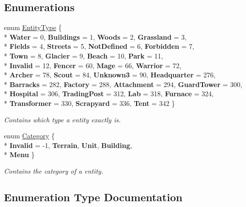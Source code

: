 \subsection*{Enumerations}
\begin{DoxyCompactItemize}
\item 
enum \hyperlink{namespaceCore_1_1Models_1_1Definitions_a609ed13db028308ebc6c5fbd98615fdc}{Entity\+Type} \{ \\*
{\bfseries Water} = 0, 
{\bfseries Buildings} = 1, 
{\bfseries Woods} = 2, 
{\bfseries Grassland} = 3, 
\\*
{\bfseries Fields} = 4, 
{\bfseries Streets} = 5, 
{\bfseries Not\+Defined} = 6, 
{\bfseries Forbidden} = 7, 
\\*
{\bfseries Town} = 8, 
{\bfseries Glacier} = 9, 
{\bfseries Beach} = 10, 
{\bfseries Park} = 11, 
\\*
{\bfseries Invalid} = 12, 
{\bfseries Fencer} = 60, 
{\bfseries Mage} = 66, 
{\bfseries Warrior} = 72, 
\\*
{\bfseries Archer} = 78, 
{\bfseries Scout} = 84, 
{\bfseries Unknown3} = 90, 
{\bfseries Headquarter} = 276, 
\\*
{\bfseries Barracks} = 282, 
{\bfseries Factory} = 288, 
{\bfseries Attachment} = 294, 
{\bfseries Guard\+Tower} = 300, 
\\*
{\bfseries Hospital} = 306, 
{\bfseries Trading\+Post} = 312, 
{\bfseries Lab} = 318, 
{\bfseries Furnace} = 324, 
\\*
{\bfseries Transformer} = 330, 
{\bfseries Scrapyard} = 336, 
{\bfseries Tent} = 342
 \}\begin{DoxyCompactList}\small\item\em Contains which type a entity exactly is. \end{DoxyCompactList}
\item 
enum \hyperlink{namespaceCore_1_1Models_1_1Definitions_a8be0403c3e883fe583d7bb3893c22c65}{Category} \{ \\*
{\bfseries Invalid} = -\/1, 
{\bfseries Terrain}, 
{\bfseries Unit}, 
{\bfseries Building}, 
\\*
{\bfseries Menu}
 \}\begin{DoxyCompactList}\small\item\em Contains the category of a entity. \end{DoxyCompactList}
\end{DoxyCompactItemize}


\subsection{Enumeration Type Documentation}
\hypertarget{namespaceCore_1_1Models_1_1Definitions_a8be0403c3e883fe583d7bb3893c22c65}{}
